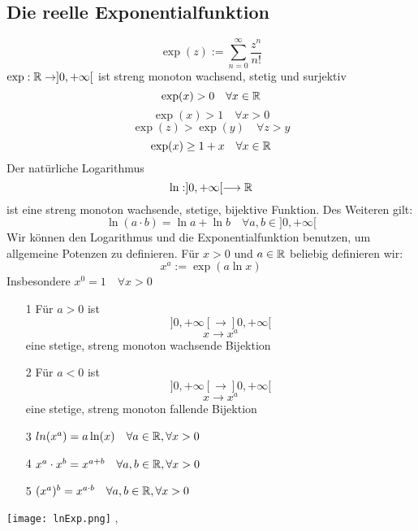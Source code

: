 \subsection{Die reelle Exponentialfunktion}
\Def[Exponentialfunktion] \[ \exp(z) := \sum_{n=0}^{\infty} \frac{z^n}{n!}\]
\Satz[3.24] \(\exp: \mathbb{R} \rightarrow ]0,+\infty[\) ist streng monoton wachsend, stetig und surjektiv \newline
\Korollar[3.25] \[ \exp(x) > 0 \quad \forall x \in \mathbb{R} \]
\[\exp(x) > 1 \quad \forall x > 0\] \newline
\Korollar[3.26] \[\exp(z) > \exp(y) \quad \forall z > y\]
\Korollar[3.27] \[\exp(x) \geq 1 + x \quad \forall x \in \mathbb{R}\]
\Korollar[3.28] Der natürliche Logarithmus
\[\ln : ]0,+\infty[ \longrightarrow \mathbb{R} \] ist eine streng monoton wachsende, stetige, bijektive Funktion. Des Weiteren gilt:
\[\ln(a \cdot b) = \ln a + \ln b \quad \forall a,b \in ]0,+\infty[\]
Wir können den Logarithmus und die Exponentialfunktion benutzen, um allgemeine Potenzen zu definieren. Für \(x > 0\) und \( a \in \mathbb{R} \) beliebig definieren wir:
\[ x^a := \exp( a \ln x)\]
Insbesondere \( x^0 = 1 \quad \forall x > 0\) \newline
\Korollar[3.29]
\begin{enumerate}
    \item [1] Für \(a > 0\) ist \[]0,+\infty[ \longrightarrow ]0,+\infty[\]
    \[x \longrightarrow x^a\] eine stetige, streng monoton wachsende Bijektion \newline
    \item [2] Für \(a < 0\) ist \[]0,+\infty[ \longrightarrow ]0,+\infty[\]
    \[x \longrightarrow x^a\] eine stetige, streng monoton fallende Bijektion
    \item [3] \(ln(x^a) = a \ln(x) \quad \forall a \in \mathbb{R}, \forall x > 0\)
    \item [4] \(x^a \cdot x^b = x^{a+b} \quad \forall a,b \in \mathbb{R}, \forall x > 0\)
    \item [5] \((x^a)^b = x^{a \cdot b} \quad \forall a,b \in \mathbb{R}, \forall x > 0\)
\end{enumerate}
\texttt{[image: lnExp.png]}
\sep
